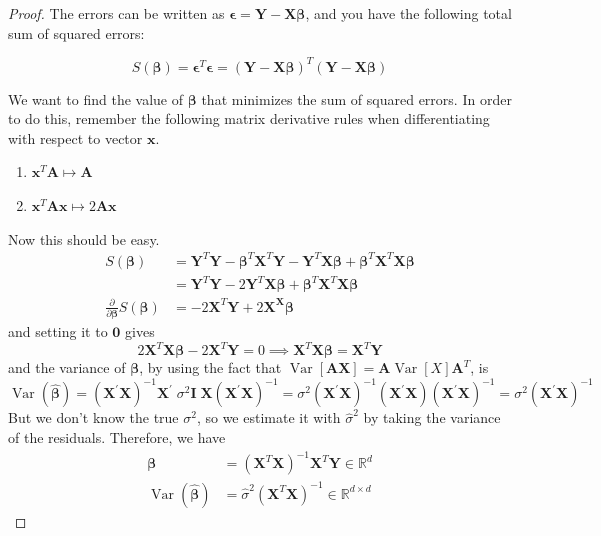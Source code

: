 \documentclass{article}
\DeclareMathOperator{\Var}{Var}
\begin{document}
    \begin{proof}
      The errors can be written as $\boldsymbol{\epsilon} = \mathbf{Y} - \mathbf{X} \boldsymbol{\beta}$, and you have the following total sum of squared errors: 

      \[S(\boldsymbol{\beta}) = \boldsymbol{\epsilon}^T \boldsymbol{\epsilon} = (\mathbf{Y} - \mathbf{X} \boldsymbol{\beta})^T (\mathbf{Y} - \mathbf{X} \boldsymbol{\beta})\]

      We want to find the value of $\boldsymbol{\beta}$ that minimizes the sum of squared errors. In order to do this, remember the following matrix derivative rules when differentiating with respect to vector $\mathbf{x}$. 
      \begin{enumerate}
        \item $\mathbf{x}^T \mathbf{A} \mapsto \mathbf{A}$
        \item $\mathbf{x}^T \mathbf{A} \mathbf{x} \mapsto 2 \mathbf{A} \mathbf{x}$
      \end{enumerate}
      Now this should be easy. 
      \begin{align*}
          S(\boldsymbol{\beta}) & = \mathbf{Y}^T \mathbf{Y} - \boldsymbol{\beta}^T \mathbf{X}^T \mathbf{Y} - \mathbf{Y}^T \mathbf{X} \boldsymbol{\beta} + \boldsymbol{\beta}^T \mathbf{X}^T \mathbf{X} \boldsymbol{\beta} \\
          & = \mathbf{Y}^T \mathbf{Y} - 2 \mathbf{Y}^T \mathbf{X} \boldsymbol{\beta} + \boldsymbol{\beta}^T \mathbf{X}^T \mathbf{X} \boldsymbol{\beta} \\
          \frac{\partial}{\partial \boldsymbol{\beta}} S(\boldsymbol{\beta}) & = - 2 \mathbf{X}^T \mathbf{Y} + 2 \mathbf{X}^ \mathbf{X} \boldsymbol{\beta}
      \end{align*}
      and setting it to $\mathbf{0}$ gives 
      \[2 \mathbf{X}^T \mathbf{X} \boldsymbol{\beta} - 2 \mathbf{X}^T \mathbf{Y} = 0 \implies \mathbf{X}^T \mathbf{X} \boldsymbol{\beta} = \mathbf{X}^T \mathbf{Y}\]
      and the variance of $\boldsymbol{\beta}$, by using the fact that $\Var[\mathbf{A} \mathbf{X}] = \mathbf{A} \Var[X] \mathbf{A}^T$, is
      \[\Var(\hat{\boldsymbol{\beta}}) =
       (\mathbf{X}^{\prime} \mathbf{X})^{-1} \mathbf{X}^{\prime}
       \;\sigma^2 \mathbf{I} \; \mathbf{X}  (\mathbf{X}^{\prime} \mathbf{X})^{-1}
      = \sigma^2 (\mathbf{X}^{\prime} \mathbf{X})^{-1} (\mathbf{X}^{\prime}
       \mathbf{X})  (\mathbf{X}^{\prime} \mathbf{X})^{-1}
      = \sigma^2  (\mathbf{X}^{\prime} \mathbf{X})^{-1}\]
      But we don't know the true $\sigma^2$, so we estimate it with $\hat{\sigma}^2$ by taking the variance of the residuals. Therefore, we have 
      \begin{align*}
          \boldsymbol{\beta} & = (\mathbf{X}^T \mathbf{X})^{-1} \mathbf{X}^T \mathbf{Y} \in \mathbb{R}^d \\
          \Var(\hat{\boldsymbol{\beta}}) & = \hat{\sigma}^2 (\mathbf{X}^T \mathbf{X})^{-1} \in \mathbb{R}^{d \times d}
      \end{align*}
    \end{proof}
\end{document}
